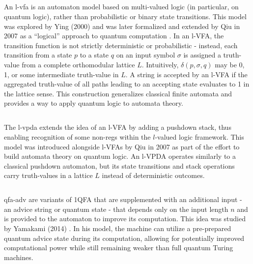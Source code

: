 \subsection{} 
An \gls{l-vfa} is an automaton model based on multi-valued logic (in particular, on quantum logic), rather than probabilistic or binary state transitions. This model was explored by Ying (2000) and was later formalized and extended by Qiu in 2007 as a “logical” approach to quantum computation \cite{qiu2007automata}. In an l-VFA, the transition function is not strictly deterministic or probabilistic - instead, each transition from a state $p$ to a state $q$ on an input symbol $\sigma$ is assigned a truth-value from a complete orthomodular lattice $L$. Intuitively, $\delta(p,\sigma,q)$ may be 0, 1, or some intermediate truth-value in $L$. A string is accepted by an l-VFA if the aggregated truth-value of all paths leading to an accepting state evaluates to 1 in the lattice sense. This construction generalizes classical finite automata and provides a way to apply quantum logic to automata theory.

\subsection{} 
The \gls{l-vpda} extends the idea of an l-VFA by adding a pushdown stack, thus enabling recognition of some non-\glspl{reg} within the $l$-valued logic framework. This model was introduced alongside l-VFAs by Qiu in 2007 \cite{qiu2007automata} as part of the effort to build automata theory on quantum logic. An l-VPDA operates similarly to a classical pushdown automaton, but its state transitions and stack operations carry truth-values in a lattice $L$ instead of deterministic outcomes.

\subsection{} 
\gls{qfa-adv} are variants of 1QFA that are supplemented with an additional input - an advice string or quantum state - that depends only on the input length $n$ and is provided to the automaton to improve its computation. This idea was studied by Yamakami (2014) \cite{yamakami2014one}. In his model, the machine can utilize a pre-prepared quantum advice state during its computation, allowing for potentially improved computational power while still remaining weaker than full quantum Turing machines.

